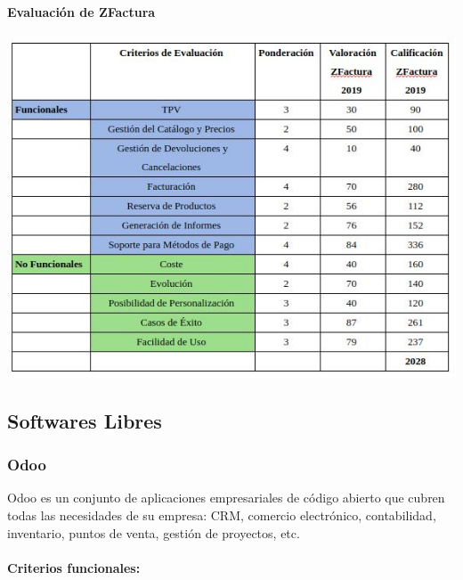 \documentclass{article}
\begin{document}
\paragraph{Evaluación de ZFactura}

\begin{flushleft}
	\includegraphics[scale=0.6]{imagenes/EvaluacionZFactura.jpg} 
\end{flushleft}

\subsection{Softwares Libres}

\subsubsection{Odoo}

Odoo es un conjunto de aplicaciones empresariales de código abierto que cubren todas las necesidades de su empresa: CRM, comercio electrónico, contabilidad, inventario, puntos de venta, gestión de proyectos, etc.

\paragraph{Criterios funcionales:}
\end{document}
